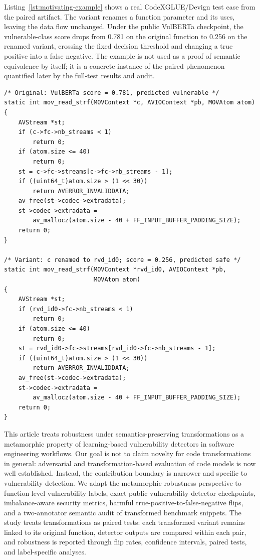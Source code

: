 \documentclass[a4paper,fleqn]{cas-dc}
\begin{document}
Listing~\ref{lst:motivating-example} shows a real CodeXGLUE/Devign test case
from the paired artifact. The variant renames a function parameter and its
uses, leaving the data flow unchanged. Under the public VulBERTa checkpoint,
the vulnerable-class score drops from 0.781 on the original function to 0.256
on the renamed variant, crossing the fixed decision threshold and changing a
true positive into a false negative. The example is not used as a proof of
semantic equivalence by itself; it is a concrete instance of the paired
phenomenon quantified later by the full-test results and audit.

\begin{lstlisting}[style=code,caption={Motivating CodeXGLUE example in which a harmless identifier rename changes the public VulBERTa prediction.},label={lst:motivating-example}]
/* Original: VulBERTa score = 0.781, predicted vulnerable */
static int mov_read_strf(MOVContext *c, AVIOContext *pb, MOVAtom atom)
{
    AVStream *st;
    if (c->fc->nb_streams < 1)
        return 0;
    if (atom.size <= 40)
        return 0;
    st = c->fc->streams[c->fc->nb_streams - 1];
    if ((uint64_t)atom.size > (1 << 30))
        return AVERROR_INVALIDDATA;
    av_free(st->codec->extradata);
    st->codec->extradata =
        av_mallocz(atom.size - 40 + FF_INPUT_BUFFER_PADDING_SIZE);
    return 0;
}

/* Variant: c renamed to rvd_id0; score = 0.256, predicted safe */
static int mov_read_strf(MOVContext *rvd_id0, AVIOContext *pb,
                         MOVAtom atom)
{
    AVStream *st;
    if (rvd_id0->fc->nb_streams < 1)
        return 0;
    if (atom.size <= 40)
        return 0;
    st = rvd_id0->fc->streams[rvd_id0->fc->nb_streams - 1];
    if ((uint64_t)atom.size > (1 << 30))
        return AVERROR_INVALIDDATA;
    av_free(st->codec->extradata);
    st->codec->extradata =
        av_mallocz(atom.size - 40 + FF_INPUT_BUFFER_PADDING_SIZE);
    return 0;
}
\end{lstlisting}

This article treats robustness under semantics-preserving transformations as a
metamorphic property of learning-based vulnerability detectors in software
engineering workflows. Our goal is not to claim novelty for code
transformations in general: adversarial and transformation-based evaluation of
code models is now well established.
Instead, the contribution boundary is narrower and specific to vulnerability
detection. We adapt the metamorphic robustness perspective to function-level
vulnerability labels, exact public vulnerability-detector checkpoints,
imbalance-aware security metrics, harmful true-positive-to-false-negative
flips, and a two-annotator semantic audit of transformed benchmark snippets.
The study treats transformations as paired tests: each
transformed variant remains linked to its original function, detector outputs
are compared within each pair, and robustness is reported through flip rates,
confidence intervals, paired tests, and label-specific analyses.
\end{document}
